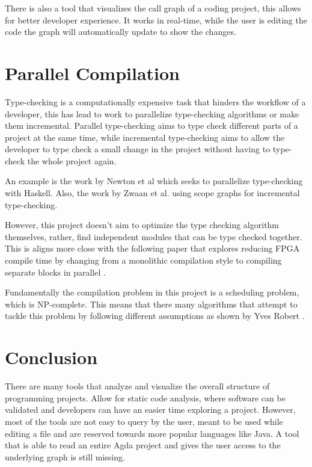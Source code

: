 There is also a tool \cite{call_graph_vis} that visualizes the call graph of a
coding project, this allows for better developer experience. It works in
real-time, while the user is editing the code the graph will automatically
update to show the changes.

\section{Parallel Compilation}

Type-checking is a computationally expensive task that hinders the workflow of
a developer, this has lead to work to parallelize type-checking algorithms or
make them incremental. Parallel type-checking aims to type check different
parts of a project at the same time, while incremental type-checking aims to
allow the developer to type check a small change in the project without having
to type-check the whole project again.

An example is the work by Newton et al \cite{paralele_comp_haskell} which seeks to
parallelize type-checking with Haskell. Also, the work by Zwaan et al.
\cite{incremental_type_checking} using scope graphs for incremental
type-checking.

However, this project doesn't aim to optimize the type checking algorithm
themselves, rather, find independent modules that can be type checked together.
This is aligns more close with the following paper that explores reducing FPGA
compile time by changing from a monolithic compilation style to compiling
separate blocks in parallel \cite{FPGA}.

Fundamentally the compilation problem in this project is a scheduling problem,
which is NP-complete\cite{scheduling}. This means that there many algorithms
that attempt to tackle this problem by following different assumptions as shown
by Yves Robert \cite{scheduling}.


\section{Conclusion}

There are many tools that analyze and visualize the overall structure of
programming projects. Allow for static code analysis, where software can be
validated and developers can have an easier time exploring a project. However,
most of the tools are not easy to query by the user, meant to be used while
editing a file and are reserved towards more popular languages like Java. A
tool that is able to read an entire Agda project and gives the user access to
the underlying graph is still missing.

